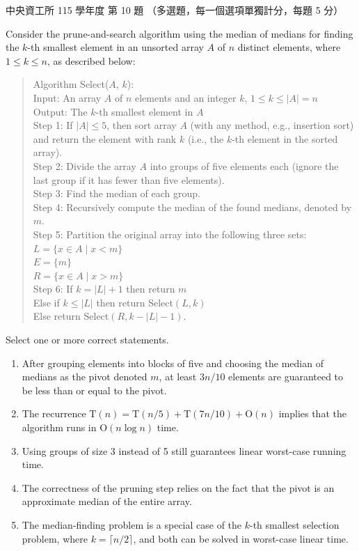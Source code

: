 \begin{pastexam}[label={px:sel-3}]{中央資工所 115 學年度 第 10 題}
（多選題，每一個選項單獨計分，每題 5 分）

Consider the prune-and-search algorithm using the median of medians for finding the $k$-th smallest element in an unsorted array $A$ of $n$ distinct elements, where $1\le k\le n$, as described below:

\begin{quote}
Algorithm Select($A$, $k$):\\
Input: An array $A$ of $n$ elements and an integer $k$, $1\le k\le |A|=n$\\
Output: The $k$-th smallest element in $A$\\
Step 1: If $|A|\le 5$, then sort array $A$ (with any method, e.g., insertion sort) and return the element with rank $k$ (i.e., the $k$-th element in the sorted array).\\
Step 2: Divide the array $A$ into groups of five elements each (ignore the last group if it has fewer than five elements).\\
Step 3: Find the median of each group.\\
Step 4: Recursively compute the median of the found medians, denoted by $m$.\\
Step 5: Partition the original array into the following three sets:\\
$L=\{x\in A\mid x<m\}$\\
$E=\{m\}$\\
$R=\{x\in A\mid x>m\}$\\
Step 6: If $k=|L|+1$ then return $m$\\
\hspace*{3.2em}Else if $k\le|L|$ then return Select$(L,k)$\\
\hspace*{3.2em}Else return Select$(R,k-|L|-1)$.
\end{quote}

Select one or more correct statements.
\begin{enumerate}[label=\Alph*.]
\item After grouping elements into blocks of five and choosing the median of medians as the pivot denoted $m$, at least $3n/10$ elements are guaranteed to be less than or equal to the pivot.
\item The recurrence $\mathrm{T}(n)=\mathrm{T}(n/5)+\mathrm{T}(7n/10)+\mathrm{O}(n)$ implies that the algorithm runs in $\mathrm{O}(n\log n)$ time.
\item Using groups of size 3 instead of 5 still guarantees linear worst-case running time.
\item The correctness of the pruning step relies on the fact that the pivot is an approximate median of the entire array.
\item The median-finding problem is a special case of the $k$-th smallest selection problem, where $k=\lceil n/2\rceil$, and both can be solved in worst-case linear time.
\end{enumerate}
\end{pastexam}


